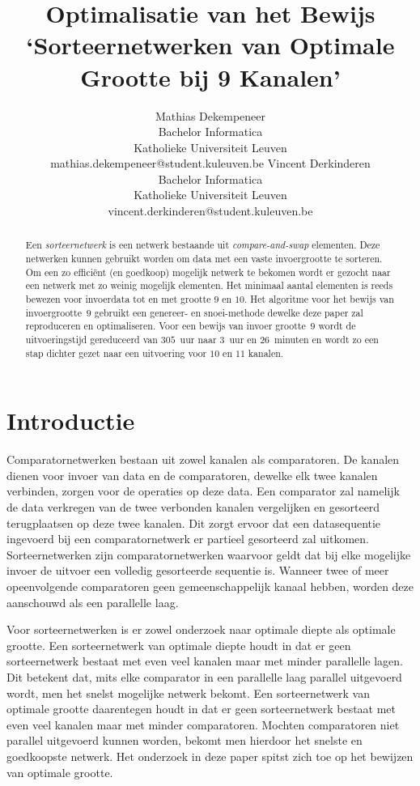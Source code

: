 \documentclass{article}
\title{Optimalisatie van het Bewijs\\ `Sorteernetwerken van Optimale Grootte bij 9 Kanalen'}
\author{Mathias Dekempeneer\\Bachelor Informatica\\Katholieke Universiteit Leuven \\mathias.dekempeneer@student.kuleuven.be
\And
Vincent Derkinderen\\Bachelor Informatica\\Katholieke Universiteit Leuven \\vincent.derkinderen@student.kuleuven.be}
\begin{document}
\maketitle

\begin{abstract}
Een \textit{sorteernetwerk} is een netwerk bestaande uit \textit{compare-and-swap} elementen.
Deze netwerken kunnen gebruikt worden om data met een vaste invoergrootte te sorteren.
Om een zo effici\"ent (en goedkoop) mogelijk netwerk te bekomen wordt er gezocht naar een netwerk met zo weinig mogelijk elementen.
Het minimaal aantal elementen is reeds bewezen voor invoerdata tot en met grootte $9$ en $10$.
Het algoritme voor het bewijs van invoergrootte~$9$ \cite{sortingNetworksSize2014} gebruikt een genereer- en snoei-methode dewelke deze paper zal reproduceren en optimaliseren.
Voor een bewijs van invoer grootte~$9$ wordt de uitvoeringstijd gereduceerd van $305$~uur naar $3$~uur en {$26$~minuten} en wordt zo een stap dichter gezet naar een uitvoering voor $10$ en $11$ kanalen.
\end{abstract}


\section{Introductie}
Comparatornetwerken bestaan uit zowel kanalen als comparatoren.
De kanalen dienen voor invoer van data en de comparatoren, dewelke elk twee kanalen verbinden, zorgen voor de operaties op deze data.
Een comparator zal namelijk de data verkregen van de twee verbonden kanalen vergelijken en gesorteerd terugplaatsen op deze twee kanalen.
Dit zorgt ervoor dat een datasequentie ingevoerd bij een comparatornetwerk er partieel gesorteerd zal uitkomen.
Sorteernetwerken zijn comparatornetwerken waarvoor geldt dat bij elke mogelijke invoer de uitvoer een volledig gesorteerde sequentie is.
Wanneer twee of meer opeenvolgende comparatoren geen gemeenschappelijk kanaal hebben, worden deze aanschouwd als een parallelle laag. 

Voor sorteernetwerken is er zowel onderzoek naar optimale diepte als optimale grootte.
Een sorteernetwerk van optimale diepte houdt in dat er geen sorteernetwerk bestaat met even veel kanalen maar met minder parallelle lagen.
Dit betekent dat, mits elke comparator in een parallelle laag parallel uitgevoerd wordt, men het snelst mogelijke netwerk bekomt.
Een sorteernetwerk van optimale grootte daarentegen houdt in dat er geen sorteernetwerk bestaat met even veel kanalen maar met minder comparatoren.
Mochten comparatoren niet parallel uitgevoerd kunnen worden, bekomt men hierdoor het snelste en goedkoopste netwerk.
Het onderzoek in deze paper spitst zich toe op het bewijzen van optimale grootte.
\end{document}

